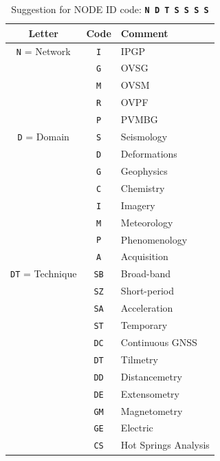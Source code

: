 
\begin{table}
\caption{Suggestion for NODE ID code: \texttt{\textbf{N D T S S S S}}}
\label{nodeidcodes}
\begin{center}
\begin{tabular}{|c|c|l|}
\hline
\textbf{Letter} & \textbf{Code} & \textbf{Comment}\\
\hline
\texttt{N} = Network         & \texttt{I}	&	IPGP\\
      			             & \texttt{G}	&	OVSG\\
      			             & \texttt{M}	&	OVSM\\
      			             & \texttt{R}	&	OVPF\\
      			             & \texttt{P}	&	PVMBG\\
\hline
\texttt{D} = Domain          & \texttt{S}	&	Seismology\\
      			             & \texttt{D}	&	Deformations\\
      			             & \texttt{G}	&	Geophysics\\
      			             & \texttt{C}	&	Chemistry\\
      			             & \texttt{I}	&	Imagery\\
      			             & \texttt{M}	&	Meteorology\\
      			             & \texttt{P}	&	Phenomenology\\
      			             & \texttt{A}	&	Acquisition\\
\hline
\texttt{DT} = Technique      & \texttt{SB}	&	Broad-band\\
      			             & \texttt{SZ}	&	Short-period\\
      			             & \texttt{SA}	&	Acceleration\\
      			             & \texttt{ST}	&	Temporary\\
      			             & \texttt{DC}	&	Continuous GNSS\\
      			             & \texttt{DT}	&	Tilmetry\\
      			             & \texttt{DD}	&	Distancemetry\\
      			             & \texttt{DE}	&	Extensometry\\
      			             & \texttt{GM}	&	Magnetometry\\
      			             & \texttt{GE}	&	Electric\\
      			             & \texttt{CS}	&	Hot Springs Analysis\\

\end{tabular}
\end{center}
\end{table}
